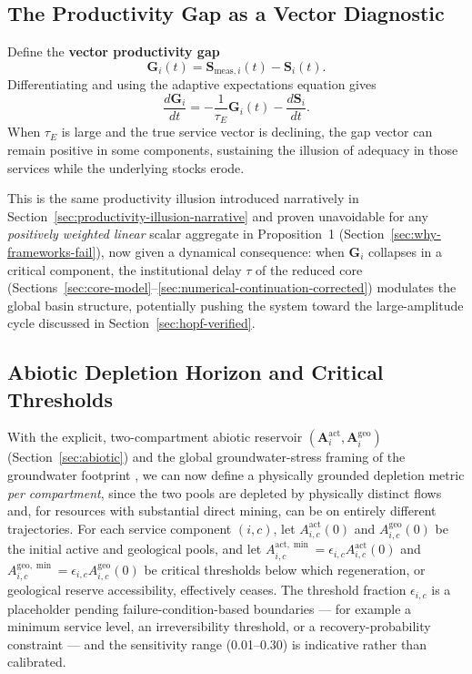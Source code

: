 \documentclass[twocolumn,10pt]{article}
\begin{document}
\subsection{The Productivity Gap as a Vector Diagnostic}
\label{sec:productivity-gap}
Define the \textbf{vector productivity gap}
\[
\mathbf{G}_i(t) = \mathbf{S}_{\text{meas},i}(t) - \mathbf{S}_i(t).
\]
Differentiating and using the adaptive expectations equation gives
\[
\frac{d\mathbf{G}_i}{dt} = -\frac{1}{\tau_E} \mathbf{G}_i(t) - \frac{d\mathbf{S}_i}{dt}.
\]
When \(\tau_E\) is large and the true service vector is declining, the gap vector can remain positive in some components, sustaining the illusion of adequacy in those services while the underlying stocks erode.

This is the same productivity illusion introduced narratively in Section~\ref{sec:productivity-illusion-narrative} and proven unavoidable for any \emph{positively weighted linear} scalar aggregate in Proposition~1 (Section~\ref{sec:why-frameworks-fail}), now given a dynamical consequence: when $\mathbf G_i$ collapses in a critical component, the institutional delay $\tau$ of the reduced core (Sections~\ref{sec:core-model}--\ref{sec:numerical-continuation-corrected}) modulates the global basin structure, potentially pushing the system toward the large-amplitude cycle discussed in Section~\ref{sec:hopf-verified}.

\subsection{Abiotic Depletion Horizon and Critical Thresholds}
\label{sec:depletion-horizon}
With the explicit, two-compartment abiotic reservoir $(\mathbf{A}^{\text{act}}_i,\mathbf A^{\text{geo}}_i)$ (Section~\ref{sec:abiotic}) and the global groundwater-stress framing of the groundwater footprint \cite{gleeson2012}, we can now define a physically grounded depletion metric \emph{per compartment}, since the two pools are depleted by physically distinct flows and, for resources with substantial direct mining, can be on entirely different trajectories. For each service component $(i,c)$, let $A^{\text{act}}_{i,c}(0)$ and $A^{\text{geo}}_{i,c}(0)$ be the initial active and geological pools, and let $A^{\text{act},\min}_{i,c} = \epsilon_{i,c} A^{\text{act}}_{i,c}(0)$ and $A^{\text{geo},\min}_{i,c} = \epsilon_{i,c} A^{\text{geo}}_{i,c}(0)$ be critical thresholds below which regeneration, or geological reserve accessibility, effectively ceases. The threshold fraction $\epsilon_{i,c}$ is a placeholder pending failure-condition-based boundaries --- for example a minimum service level, an irreversibility threshold, or a recovery-probability constraint --- and the sensitivity range (0.01--0.30) is indicative rather than calibrated.
\end{document}
